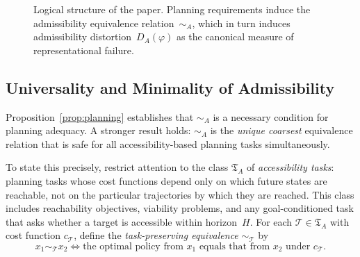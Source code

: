 \documentclass[11pt, a4paper]{article}
\theoremstyle{plain}
\theoremstyle{definition}
\theoremstyle{remark}
\newcommand{\simA}{\sim_A}
\newcommand{\DA}{D_A(\varphi)}
\begin{document}
\begin{figure}[t]
\centering
{}
\caption{Logical structure of the paper. Planning requirements induce the
admissibility equivalence relation~$\simA$, which in turn induces
admissibility distortion~$\DA$ as the canonical measure of
representational failure.}
\label{fig:core}
\end{figure}

\subsection{Universality and Minimality of Admissibility}

Proposition~\ref{prop:planning} establishes that $\simA$ is a necessary
condition for planning adequacy. A stronger result holds: $\simA$ is the
\emph{unique coarsest} equivalence relation that is safe for all
accessibility-based planning tasks simultaneously.

To state this precisely, restrict attention to the class $\mathfrak{T}_A$ of
\emph{accessibility tasks}: planning tasks whose cost functions depend only on
which future states are reachable, not on the particular trajectories by which
they are reached. This class includes reachability objectives, viability
problems, and any goal-conditioned task that asks whether a target is accessible
within horizon~$H$. For each $\mathcal{T} \in \mathfrak{T}_A$ with cost
function $c_{\mathcal{T}}$, define the \emph{task-preserving equivalence}
$\sim_{\mathcal{T}}$ by
\begin{equation}
  x_1 \sim_{\mathcal{T}} x_2
  \iff
  \text{the optimal policy from } x_1 \text{ equals that from } x_2
  \text{ under } c_{\mathcal{T}}.
\end{equation}
\end{document}
